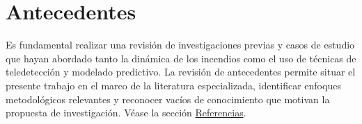 \section{Antecedentes}
Es fundamental realizar una revisión de investigaciones previas y casos de estudio que hayan abordado tanto la dinámica de los incendios como el uso de técnicas de teledetección y modelado predictivo. La revisión de antecedentes permite situar el presente trabajo en el marco de la literatura especializada, identificar enfoques metodológicos relevantes y reconocer vacíos de conocimiento que motivan la propuesta de investigación. Véase la sección \hyperref[sec:refs]{Referencias}.